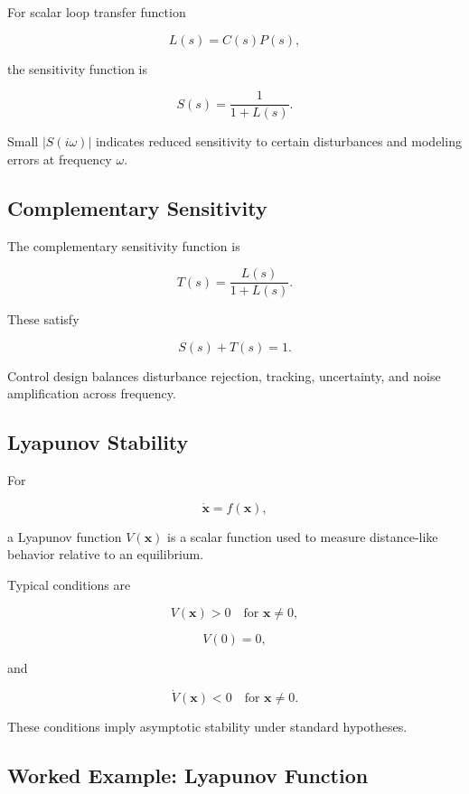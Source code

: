 For scalar loop transfer function

\[
L(s)=C(s)P(s),
\]

the sensitivity function is

\[
\boxed{
S(s)
=
\frac{1}{1+L(s)}.
}
\]

Small \(|S(i\omega)|\) indicates reduced sensitivity to certain disturbances
and modeling errors at frequency \(\omega\).

\subsection{Complementary Sensitivity}
\label{subsec:complementary-sensitivity}

The complementary sensitivity function is

\[
\boxed{
T(s)
=
\frac{L(s)}
{1+L(s)}.
}
\]

These satisfy

\[
\boxed{
S(s)+T(s)=1.
}
\]

Control design balances disturbance rejection, tracking, uncertainty, and
noise amplification across frequency.

\subsection{Lyapunov Stability}
\label{subsec:control-lyapunov-stability}

For

\[
\dot{\mathbf{x}}
=
f(\mathbf{x}),
\]

a Lyapunov function \(V(\mathbf{x})\) is a scalar function used to measure
distance-like behavior relative to an equilibrium.

Typical conditions are

\[
\boxed{
V(\mathbf{x})>0
\quad
\text{for }\mathbf{x}\neq0,
}
\]

\[
\boxed{
V(0)=0,
}
\]

and

\[
\boxed{
\dot V(\mathbf{x})<0
\quad
\text{for }\mathbf{x}\neq0.
}
\]

These conditions imply asymptotic stability under standard hypotheses.

\subsection{Worked Example: Lyapunov Function}
\label{subsec:worked-lyapunov-control}


